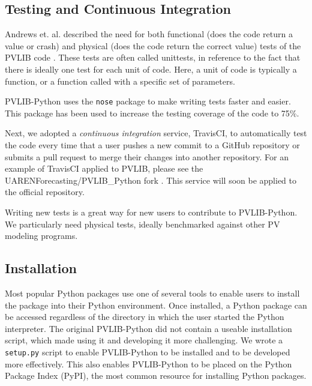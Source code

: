 \documentclass[conference]{IEEEtran}
\begin{document}
\subsection{Testing and Continuous Integration}

Andrews et. al. described the need for both functional (does the code return a value or crash) and physical (does the code return the correct value) tests of the PVLIB code \cite{andrews}.
These tests are often called unittests, in reference to the fact that there is ideally one test for each unit of code.
Here, a unit of code is typically a function, or a function called with a specific set of parameters.

PVLIB-Python uses the \texttt{nose} package \cite{nosetests} to make writing tests faster and easier.
This package has been used to increase the testing coverage of the code to 75\%.

Next, we adopted a \emph{continuous integration} service, TravisCI, to automatically test the code every time that a user pushes a new commit to a GitHub repository or submits a pull request to merge their changes into another repository. 
For an example of TravisCI applied to PVLIB, please see the UARENForecasting/PVLIB{\_}Python fork \cite{uaren-pvlib}.
This service will soon be applied to the official repository.

Writing new tests is a great way for new users to contribute to PVLIB-Python. We particularly need physical tests, ideally benchmarked against other PV modeling programs.


\subsection{Installation}

Most popular Python packages use one of several tools to enable users to install the package into their Python environment.
Once installed, a Python package can be accessed regardless of the directory in which the user started the Python interpreter.
The original PVLIB-Python did not contain a useable installation script, which made using it and developing it more challenging.
We wrote a \texttt{setup.py} script to enable PVLIB-Python to be installed and to be developed more effectively.
This also enables PVLIB-Python to be placed on the Python Package Index (PyPI), the most common resource for installing Python packages.


\end{document}
